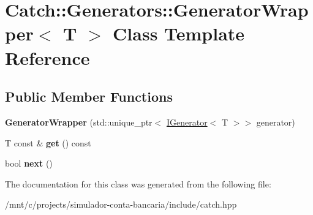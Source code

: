 \hypertarget{classCatch_1_1Generators_1_1GeneratorWrapper}{}\section{Catch\+:\+:Generators\+:\+:Generator\+Wrapper$<$ T $>$ Class Template Reference}
\label{classCatch_1_1Generators_1_1GeneratorWrapper}
\subsection*{Public Member Functions}
\begin{DoxyCompactItemize}
\item 
\mbox{\label{classCatch_1_1Generators_1_1GeneratorWrapper_aecffeafd4fd38d91a52dadf28b6e2b29}} 
{\bfseries Generator\+Wrapper} (std\+::unique\+\_\+ptr$<$ \hyperlink{structCatch_1_1Generators_1_1IGenerator}{I\+Generator}$<$ T $>$$>$ generator)
\item 
\mbox{\label{classCatch_1_1Generators_1_1GeneratorWrapper_a271f0f905f2c473c907550435b81e102}} 
T const  \& {\bfseries get} () const
\item 
\mbox{\label{classCatch_1_1Generators_1_1GeneratorWrapper_acbfdca94811ae02461bd2cf5f60b666e}} 
bool {\bfseries next} ()
\end{DoxyCompactItemize}


The documentation for this class was generated from the following file\+:\begin{DoxyCompactItemize}
\item 
/mnt/c/projects/simulador-\/conta-\/bancaria/include/catch.\+hpp\end{DoxyCompactItemize}
